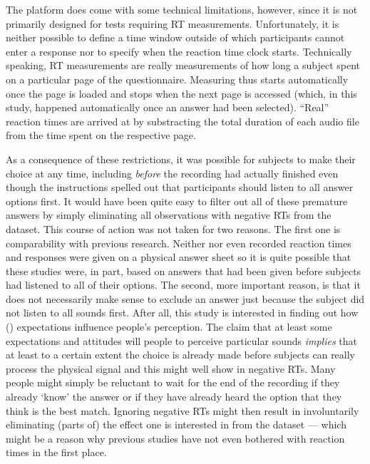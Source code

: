 The platform  does come with some technical limitations, however, since it is not primarily designed for tests requiring RT measurements.
Unfortunately, it is neither possible to define a time window outside of which participants cannot enter a response nor to specify when the reaction time clock starts.
Technically speaking, RT measurements are really measurements of how long a subject spent on a particular page of the questionnaire.
Measuring thus starts automatically once the page is loaded and stops when the next page is accessed (which, in this study, happened automatically once an answer had been selected).
``Real'' reaction times are arrived at by substracting the total duration of each audio file from the time spent on the respective page.

As a consequence of these restrictions, it was possible for subjects to make their choice at any time, including \emph{before} the recording had actually finished even though the instructions spelled out that participants should listen to all answer options first.
It would have been quite easy to filter out all of these premature answers by simply eliminating all observations with negative RTs from the dataset.
This course of action was not taken for two reasons.
The first one is comparability with previous research.
Neither \textcite{niedzielski1999} nor \textcite{hayetal2006b,haydrager2010} even recorded reaction times and responses were given on a physical answer sheet so it is quite possible that these studies were, in part, based on answers that had been given before subjects had listened to all of their options.
The second, more important reason, is that it does not necessarily make sense to exclude an answer just because the subject did not listen to all  sounds first.
After all, this study is interested in finding out how () expectations influence people's perception.
The claim that at least some expectations and attitudes will  people to perceive particular sounds \emph{implies} that at least to a certain extent the choice is already made before subjects can really process the physical signal and this might well show in negative RTs.
Many people might simply be reluctant to wait for the end of the recording if they already `know' the answer or if they have already heard the option that they think is the best match.
Ignoring negative RTs might then result in involuntarily eliminating (parts of) the  effect one is interested in from the dataset --- which might be a reason why previous studies have not even bothered with reaction times in the first place.

